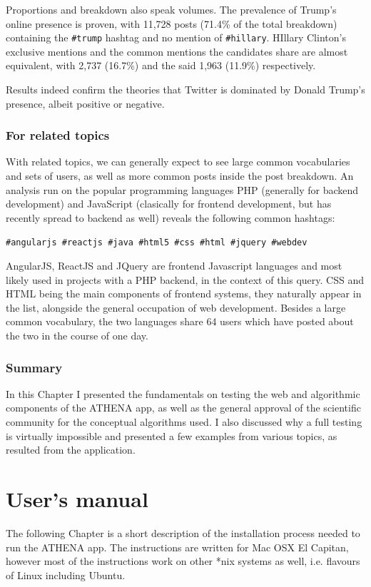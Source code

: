 \documentclass[12pt,a4paper,twoside]{report}
\begin{document}
Proportions and breakdown also speak volumes. The prevalence of Trump's online presence is proven, with 11,728 posts (71.4\% of the total breakdown) containing the \texttt{\#trump} hashtag and no mention of \texttt{\#hillary}. HIllary Clinton's exclusive mentions and the common mentions the candidates share are almost equivalent, with 2,737 (16.7\%) and the said 1,963 (11.9\%) respectively.

Results indeed confirm the theories that Twitter is dominated by Donald Trump's presence, albeit positive or negative.

\subsection{For related topics}
With related topics, we can generally expect to see large common vocabularies and sets of users, as well as more common posts inside the post breakdown.  An analysis run on the popular programming languages PHP (generally for backend development) and JavaScript (clasically for frontend development, but has recently spread to backend as well) reveals the following common hashtags:

\texttt{\#angularjs \#reactjs \#java \#html5 \#css \#html \#jquery \#webdev}

AngularJS, ReactJS and JQuery are frontend Javascript languages and most likely used in projects with a PHP backend, in the context of this query. CSS and HTML being the main components of frontend systems, they naturally appear in the list, alongside the general occupation of web development. Besides a large common vocabulary, the two languages share 64 users which have posted about the two in the course of one day.

\subsection{Summary}
In this Chapter I presented the fundamentals on testing the web and algorithmic components of the ATHENA app, as well as the general approval of the scientific community for the conceptual algorithms used. I also discussed why a full testing is virtually impossible and presented a few examples from various topics, as resulted from the application.

\chapter{User's manual}
The following Chapter is a short description of the installation process needed to run the ATHENA app. The instructions are written for Mac OSX El Capitan, however most of the instructions work on other *nix systems as well, i.e. flavours of Linux including Ubuntu.
\end{document}
